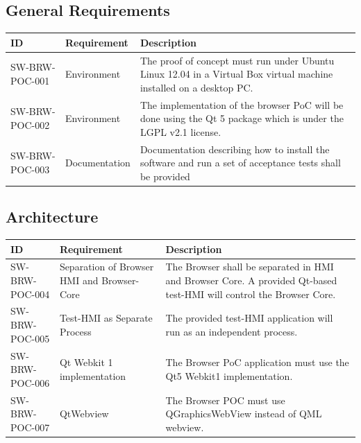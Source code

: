 \documentclass{pelagicore}
\begin{document}
\subsection{General Requirements}
\begin{tabularx}{\textwidth}{| p{4em} | p{6.5em} | X |}
    \hline
    \rowcolor{blue}
    \bf ID & \bf Requirement & \bf Description \\
    \hline
    SW-BRW-POC-001 & Environment   & The proof of concept must run under Ubuntu
                                     Linux 12.04 in a Virtual Box virtual
                                     machine installed on a desktop PC. \\
    \hline
    SW-BRW-POC-002 & Environment   & The implementation of the browser PoC will
                                     be done using the Qt 5 package which is
                                     under the LGPL v2.1 license. \\
    \hline
    SW-BRW-POC-003 & Documentation & Documentation describing how to install
                                     the software and run a set of acceptance
                                     tests shall be provided \\
    \hline
\end{tabularx}

\subsection{Architecture}
\begin{tabularx}{\textwidth}{|p{4em} | p{6.5em} | X |}
    \hline
    \rowcolor{blue}
    \bf ID & \bf Requirement & \bf Description \\
    \hline
    SW-BRW-POC-004 & Separation of Browser HMI and Browser-Core &
        The Browser shall be separated in HMI and Browser Core.
        A provided Qt-based test-HMI will control the Browser Core. \\
    \hline
    SW-BRW-POC-005 & Test-HMI as Separate Process &
        The provided test-HMI application will run as an independent process.\\
    \hline
    SW-BRW-POC-006 & Qt Webkit 1 implementation &
        The Browser PoC application must use the Qt5 Webkit1 implementation.\\
    \hline
    SW-BRW-POC-007 & QtWebview &
        The Browser POC must use QGraphicsWebView instead of QML webview.\\
    \hline
\end{tabularx}
\end{document}
